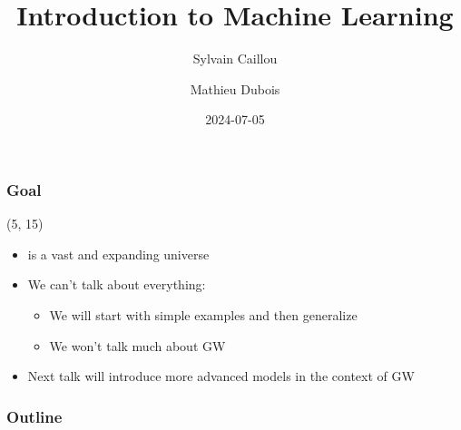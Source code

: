 \documentclass[10pt]{beamer}
\title{Introduction to Machine Learning}
\author{Sylvain Caillou \and Mathieu Dubois}
\institute{L2IT}
\date{2024-07-05}
\begin{document}
\frame{\titlepage}


\begin{frame}
  \frametitle{Goal}

  \begin{textblock}{90}(5, 15)
    \begin{itemize}
    \item {} is a vast and expanding universe 
    \item<3-> We can't talk about everything:
      \begin{itemize}
      \item<4-> We will start with simple examples and then generalize
      \item<4-> We won't talk much about GW
      \end{itemize}
    \item<5-> Next talk will introduce more advanced models in the context of GW
    \end{itemize}
  \end{textblock}
\end{frame}


\begin{frame}
  \frametitle{Outline}
  \tableofcontents[hidesubsections]
\end{frame}







\appendix






\end{document}
